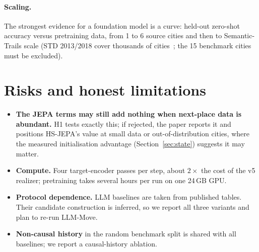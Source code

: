 \documentclass[10.5pt]{article}
\begin{document}
\paragraph{Scaling.} The strongest evidence for a foundation model is a curve: held-out zero-shot accuracy versus
pretraining data, from 1 to 6 source cities and then to Semantic-Trails scale (STD 2013/2018 cover thousands of
cities~\cite{std}; the 15 benchmark cities must be excluded).

\section{Risks and honest limitations}
\begin{itemize}
\item \textbf{The JEPA terms may still add nothing when next-place data is abundant.} H1 tests exactly this; if
rejected, the paper reports it and positions HS-JEPA's value at small data or out-of-distribution cities, where the
measured initialisation advantage (Section~\ref{sec:state}) suggests it may matter.
\item \textbf{Compute.} Four target-encoder passes per step, about $2\times$ the cost of the v5 realizer; pretraining
takes several hours per run on one 24\,GB GPU.
\item \textbf{Protocol dependence.} LLM baselines are taken from published tables. Their candidate construction is
inferred, so we report all three variants and plan to re-run LLM-Move.
\item \textbf{Non-causal history} in the random benchmark split is shared with all baselines; we report a causal-history
ablation.
\end{itemize}
\end{document}
